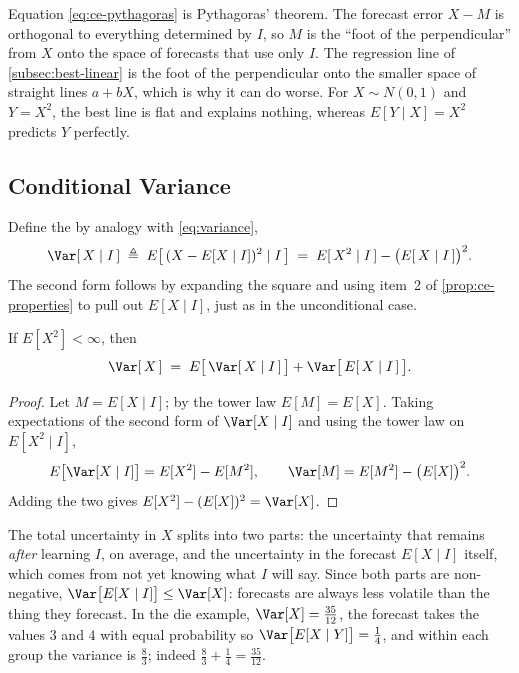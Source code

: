 Equation \eqref{eq:ce-pythagoras} is Pythagoras' theorem.
The forecast error $X-M$ is orthogonal to everything determined by $I$, so $M$ is the ``foot of the perpendicular'' from $X$ onto the space of forecasts that use only $I$.
The regression line of \autoref{subsec:best-linear} is the foot of the perpendicular onto the smaller space of straight lines $a+bX$, which is why it can do worse.
For $X\sim N(0,1)$ and $Y=X^{2}$, the best line is flat and explains nothing, whereas $E[Y\mid X]=X^{2}$ predicts $Y$ perfectly.

\subsection{Conditional Variance}

Define the  by analogy with \eqref{eq:variance},
\[
	\Var[\,X\mid I\,] \;\triangleq\; E\bigl[\,(X-E[X\mid I])^{2}\mid I\,\bigr]
	\;=\; E[\,X^{2}\mid I\,]-\bigl(E[\,X\mid I\,]\bigr)^{2} .
\]
The second form follows by expanding the square and using item~2 of \autoref{prop:ce-properties} to pull out $E[X\mid I]$, just as in the unconditional case.

\begin{proposition}
	If $E[X^{2}]<\infty$, then
	\begin{equation}
		\Var[\,X\,] \;=\; E\bigl[\,\Var[\,X\mid I\,]\,\bigr] + \Var\bigl[\,E[\,X\mid I\,]\,\bigr] . \label{eq:total-variance}
	\end{equation}
\end{proposition}

\begin{proof}
	Let $M=E[X\mid I]$; by the tower law $E[M]=E[X]$.
	Taking expectations of the second form of $\Var[X\mid I]$ and using the tower law on $E[X^{2}\mid I]$,
	\[
		E\bigl[\Var[X\mid I]\bigr] = E[X^{2}]-E[M^{2}] ,
		\qquad
		\Var[M] = E[M^{2}]-\bigl(E[X]\bigr)^{2} .
	\]
	Adding the two gives $E[X^{2}]-(E[X])^{2}=\Var[X]$.
\end{proof}

The total uncertainty in $X$ splits into two parts:
the uncertainty that remains \emph{after} learning $I$, on average,
and the uncertainty in the forecast $E[X\mid I]$ itself, which comes from not yet knowing what $I$ will say.
Since both parts are non-negative, $\Var\bigl[E[X\mid I]\bigr]\le\Var[X]$: forecasts are always less volatile than the thing they forecast.
In the die example, $\Var[X]=\tfrac{35}{12}$, the forecast takes the values $3$ and $4$ with equal probability so $\Var\bigl[E[X\mid Y]\bigr]=\tfrac14$, and within each group the variance is $\tfrac83$; indeed $\tfrac83+\tfrac14=\tfrac{35}{12}$.

